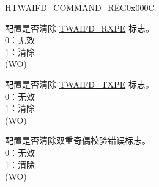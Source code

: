 \addtocounter{Regfloat}{-1}
\begin{register}{H}{TWAIFD\_COMMAND\_REG}{0x000C}
\begin{regdesc}\begin{reglist}
\item [...接上页]

\label{fielddesc:TWAIFDCRXPE}\item [TWAIFD\_CRXPE] 配置是否清除 \hyperref[fielddesc:TWAIFDRXPE]{TWAIFD\_RXPE} 标志。\\
0：无效\\
1：清除\\(WO)
\label{fielddesc:TWAIFDCTXPE}\item [TWAIFD\_CTXPE] 配置是否清除 \hyperref[fielddesc:TWAIFDTXPE]{TWAIFD\_TXPE} 标志。\\
0：无效\\
1：清除\\(WO)
\label{fielddesc:TWAIFDCTXDPE}\item [TWAIFD\_CTXDPE] 配置是否清除双重奇偶校验错误标志。\\
0：无效\\
1：清除\\(WO)
\end{reglist}\end{regdesc}
\end{register}


